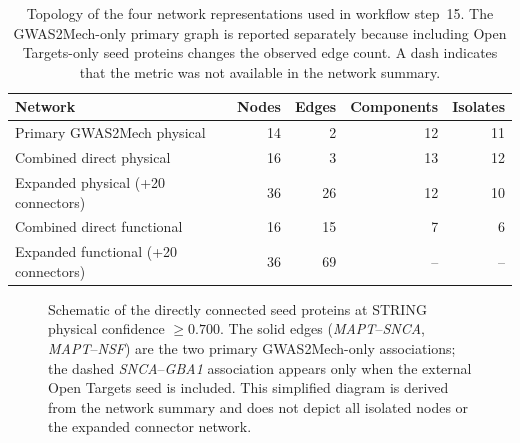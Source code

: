 \documentclass[11pt,a4paper]{article}
\begin{document}
\begin{table}[!htbp]
\centering\small
\caption{Topology of the four network representations used in workflow step~15. The GWAS2Mech-only primary graph is reported separately because including Open Targets-only seed proteins changes the observed edge count. A dash indicates that the metric was not available in the network summary.}
\label{tab:step15_network_summary}
\begin{tabular}{@{}lrrrr@{}}
\toprule
Network & Nodes & Edges & Components & Isolates \\\midrule
Primary GWAS2Mech physical & 14 & 2 & 12 & 11 \\
Combined direct physical & 16 & 3 & 13 & 12 \\
Expanded physical (+20 connectors) & 36 & 26 & 12 & 10 \\
Combined direct functional & 16 & 15 & 7 & 6 \\
Expanded functional (+20 connectors) & 36 & 69 & -- & -- \\
\bottomrule
\end{tabular}
\end{table}

\begin{figure}[!htbp]
\centering
{}
\caption{Schematic of the directly connected seed proteins at STRING physical confidence $\geq 0.700$. The solid edges (\textit{MAPT}--\textit{SNCA}, \textit{MAPT}--\textit{NSF}) are the two primary GWAS2Mech-only associations; the dashed \textit{SNCA}--\textit{GBA1} association appears only when the external Open Targets seed is included. This simplified diagram is derived from the network summary and does not depict all isolated nodes or the expanded connector network.}
\label{fig:step15_primary_physical}
\end{figure}
\end{document}
